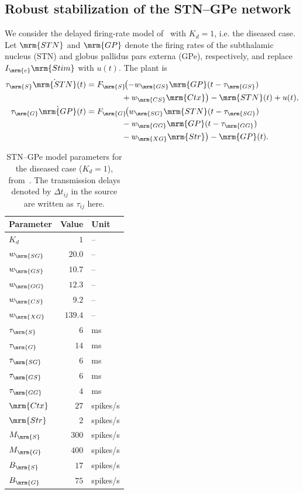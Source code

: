 \subsection{Robust stabilization of the STN--GPe network}
We consider the delayed firing-rate model
of~\cite[Eq.~(5)]{nevadoHolgado2010betaOscillations} with $K_d =1$, i.e. the diseased case.
Let $\mrm{STN}$ and
$\mrm{GP}$ denote the firing rates of the subthalamic nucleus (STN) and
globus pallidus pars externa (GPe), respectively, and replace $I_{\mrm{e}}\mrm{Stim}$
with $ u(t)$. The plant is
\begin{equation}
      \begin{aligned}
      \tau_{\mrm{S}} \dot{\mrm{STN}}(t)
          ={}&F_{\mrm{S}}\!\bigl(-w_{\mrm{GS}}\mrm{GP}
              (t-\tau_{\mrm{GS}})\\
             &\qquad\quad +w_{\mrm{CS}}\mrm{Ctx}\bigr)
              -\mrm{STN}(t)+ u(t),\\
      \tau_{\mrm{G}} \dot{\mrm{GP}}(t)
          ={}&F_{\mrm{G}}\!\bigl(w_{\mrm{SG}}\mrm{STN}
              (t-\tau_{\mrm{SG}})\\
             &\qquad\quad-w_{\mrm{GG}}\mrm{GP}(t-\tau_{\mrm{GG}})\\
             &\qquad\quad-w_{\mrm{XG}}\mrm{Str}\bigr)-\mrm{GP}(t).
      \end{aligned}
\end{equation}
\begin{table}[H]
 \centering
 \caption{STN--GPe model parameters for the diseased case ($K_d=1$),
 from~\cite[Tables~1 and~3]{nevadoHolgado2010betaOscillations}.
 The transmission delays denoted by $\Delta t_{ij}$ in the source
 are written as $\tau_{ij}$ here.}
 \label{tab:stn-gpe-diseased-parameters}
 \small
 \begin{tabular}{@{}lrl@{}}
  \toprule
  Parameter & Value & Unit \\
  \midrule
  $K_d$ & $1$ & -- \\
  \midrule
  $w_{\mrm{SG}}$ & $20.0$ & -- \\
  $w_{\mrm{GS}}$ & $10.7$ & -- \\
  $w_{\mrm{GG}}$ & $12.3$ & -- \\
  $w_{\mrm{CS}}$ & $9.2$ & -- \\
  $w_{\mrm{XG}}$ & $139.4$ & -- \\
  \midrule
  $\tau_{\mrm{S}}$ & $6$ & ms \\
  $\tau_{\mrm{G}}$ & $14$ & ms \\
  $\tau_{\mrm{SG}}$ & $6$ & ms \\
  $\tau_{\mrm{GS}}$ & $6$ & ms \\
  $\tau_{\mrm{GG}}$ & $4$ & ms \\
  \midrule
  $\mrm{Ctx}$ & $27$ & spikes/s \\
  $\mrm{Str}$ & $2$ & spikes/s \\
  $M_{\mrm{S}}$ & $300$ & spikes/s \\
  $M_{\mrm{G}}$ & $400$ & spikes/s \\
  $B_{\mrm{S}}$ & $17$ & spikes/s \\
  $B_{\mrm{G}}$ & $75$ & spikes/s \\
  \bottomrule
 \end{tabular}
\end{table}
